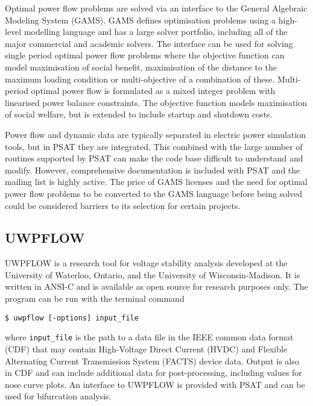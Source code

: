
Optimal power flow problems are solved via an interface to the General
Algebraic Modeling System (GAMS).  GAMS defines optimisation
problems using a high-level modelling language and has a large solver portfolio, including all
of the major commercial and academic solvers.  The interface can be used for
solving single period optimal power flow problems where the objective function
can model maximisation of social benefit, maximisation of the distance to
the maximum loading condition or multi-objective of a combination of these.
Multi-period optimal power flow is formulated as a mixed integer problem with
linearised power balance constraints.  The objective function models
maximisation of social welfare, but is extended to include startup and
shutdown costs.

Power flow and dynamic data are typically separated in electric power
simulation tools, but in PSAT they are integrated.  This combined with the
large number of routines supported by PSAT can make the code base difficult to
understand and modify.  However, comprehensive documentation is included with
PSAT and the mailing list is highly active.
The price of GAMS
licenses and the need for optimal power flow problems to be converted to the
GAMS language before being solved could be considered barriers to its
selection for certain projects.

\subsection*{UWPFLOW}
UWPFLOW is a research tool for voltage stability analysis developed at the
University of Waterloo, Ontario, and the University of Wisconsin-Madison.  It
is written in ANSI-C and is available as open source for research purposes
only. The program can be run with the terminal command
\begin{center}
\begin{verbatim}
$ uwpflow [-options] input_file
\end{verbatim}
\end{center}
where \texttt{input\_file} is the path to a data file in the IEEE common data
format (CDF) \cite{cdf:73} that may contain High-Voltage Direct Current (HVDC)
and Flexible Alternating Current Transmission System (FACTS) device data.
Output is also in CDF and can include additional data for post-processing,
including values for nose curve plots.  An interface to UWPFLOW is provided
with PSAT and can be used for bifurcation analysis.

